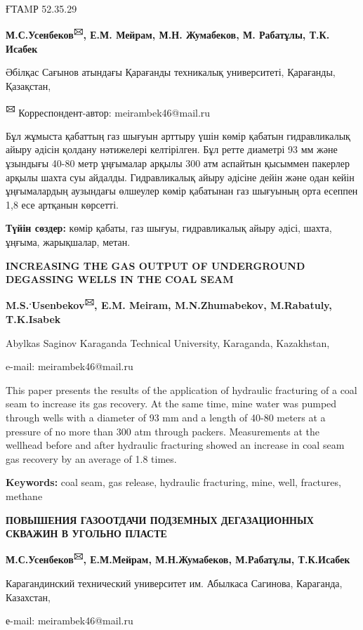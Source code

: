 ҒТАMР 52.35.29


\begin{center}
{\bfseries М.С.Усенбеков\textsuperscript{🖂}, Е.М. Мейрам, М.Н. Жумабеков, М. Рабатұлы, Т.К. Исабек}

Әбілқас Сағынов атындағы Қарағанды техникалық университеті, Қарағанды,
Қазақстан,

{\bfseries \textsuperscript{🖂}} Корреспондент-автор: meirambek46@mail.ru
\end{center}

Бұл жұмыста қабаттың газ шығуын арттыру үшін көмір қабатын гидравликалық
айыру әдісін қолдану нәтижелері келтірілген. Бұл ретте диаметрі 93 мм
және ұзындығы 40-80 метр ұңғымалар арқылы 300 атм аспайтын қысыммен
пакерлер арқылы шахта суы айдалды. Гидравликалық айыру әдісіне дейін
және одан кейін ұңғымалардың аузындағы өлшеулер көмір қабатынан газ
шығуының орта есеппен 1,8 есе артқанын көрсетті.

{\bfseries Түйін сөздер:} көмір қабаты, газ шығуы, гидравликалық айыру
әдісі, шахта, ұңғыма, жарықшалар, метан.

\begin{center}
{\large\bfseries INCREASING THE GAS OUTPUT OF UNDERGROUND DEGASSING WELLS IN THE
COAL SEAM}

{\bfseries M.S.\textsuperscript{.}Usenbekov\textsuperscript{🖂}, E.M.
Meiram, M.N.Zhumabekov, M.Rabatuly, T.K.Isabek}

Abylkas Saginov Karaganda Technical University, Karaganda, Kazakhstan,

e-mail: meirambek46@mail.ru
\end{center}

This paper presents the results of the application of hydraulic
fracturing of a coal seam to increase its gas recovery. At the same
time, mine water was pumped through wells with a diameter of 93 mm and a
length of 40-80 meters at a pressure of no more than 300 atm through
packers. Measurements at the wellhead before and after hydraulic
fracturing showed an increase in coal seam gas recovery by an average of
1.8 times.

{\bfseries Keywords:} coal seam, gas release, hydraulic fracturing, mine,
well, fractures, methane

\begin{center}
{\large\bfseries ПОВЫШЕНИЯ ГАЗООТДАЧИ ПОДЗЕМНЫХ ДЕГАЗАЦИОННЫХ СКВАЖИН В УГОЛЬНО
ПЛАСТЕ}

{\bfseries М.С.Усенбеков\textsuperscript{🖂}, Е.М.Мейрам, М.Н.Жумабеков,
М.Рабатұлы, Т.К.Исабек}

Карагандинский технический университет им. Абылкаса Сагинова, Караганда,
Казахстан,

е-mail: meirambek46@mail.ru
\end{center}

